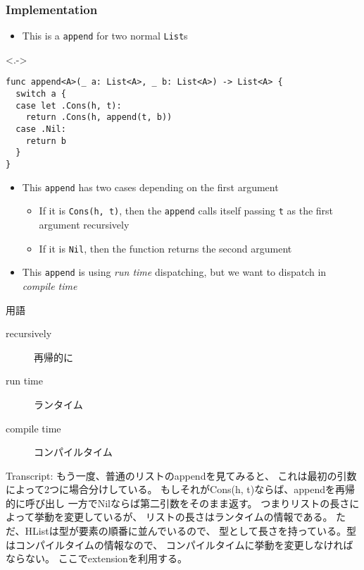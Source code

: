 \begin{frame}[fragile]
  \frametitle{Implementation}

  \begin{itemize}
    \item<+-> This is a \lstinline|append| for two normal \lstinline|List|s
  \end{itemize}

  \begin{uncoverenv}<.->
\begin{lstlisting}[style=swift]
func append<A>(_ a: List<A>, _ b: List<A>) -> List<A> {
  switch a {
  case let .Cons(h, t):
    return .Cons(h, append(t, b))
  case .Nil:
    return b
  }
}  
\end{lstlisting}     
  \end{uncoverenv}

  \begin{itemize}
    \item<+-> This \lstinline|append| has two cases depending on
    the first argument
    \begin{itemize}
      \item If it is \lstinline|Cons(h, t)|,
      then the \lstinline|append| calls itself
      passing \lstinline|t| as the first argument recursively
      
      \item If it is \lstinline|Nil|,
      then the function returns the second argument
    \end{itemize}

    \item<+-> This \lstinline|append| is using \emph{run time} dispatching,
    but we want to dispatch in \emph{compile time}
  \end{itemize}

  \begin{notes}
    \item 用語
    \begin{description}
      \item[recursively] 再帰的に
      \item[run time] ランタイム
      \item[compile time] コンパイルタイム
    \end{description}

    \item Transcript:
    もう一度、普通のリストのappendを見てみると、
    これは最初の引数によって2つに場合分けしている。
    もしそれがCons(h, t)ならば、appendを再帰的に呼び出し
    一方でNilならば第二引数をそのまま返す。
    つまりリストの長さによって挙動を変更しているが、
    リストの長さはランタイムの情報である。
    ただ、HListは型が要素の順番に並んでいるので、
    型として長さを持っている。型はコンパイルタイムの情報なので、
    コンパイルタイムに挙動を変更しなければならない。
    ここでextensionを利用する。
  \end{notes}
\end{frame}

